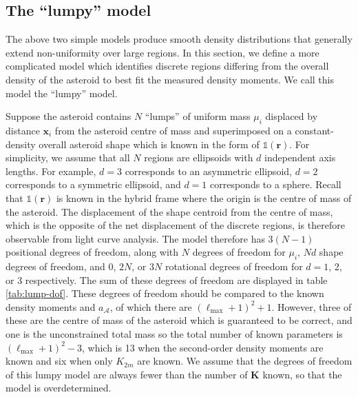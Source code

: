 \documentclass[fleqn,usenatbib]{mnras}
\begin{document}
\subsection{The ``lumpy'' model}
\label{sec:lumpy}

The above two simple models produce smooth density distributions that generally extend non-uniformity over large regions. In this section, we define a more complicated model which identifies discrete regions differing from the overall density of the asteroid to best fit the measured density moments. We call this model the ``lumpy'' model.

Suppose the asteroid contains $N$ ``lumps'' of uniform mass $\mu_i$ displaced by distance $\bm x_i$ from the asteroid centre of mass and superimposed on a constant-density overall asteroid shape which is known in the form of $\mathds{1}(\bm r)$. For simplicity, we assume that all $N$ regions are ellipsoids with $d$ independent axis lengths. For example, $d=3$ corresponds to an asymmetric ellipsoid, $d=2$ corresponds to a symmetric ellipsoid, and $d=1$ corresponds to a sphere. Recall that $\mathds{1}(\bm r)$ is known in the hybrid frame where the origin is the centre of mass of the asteroid. The displacement of the shape centroid from the centre of mass, which is the opposite of the net displacement of the discrete regions, is therefore observable from light curve analysis. The model therefore has $3(N-1)$ positional degrees of freedom, along with $N$ degrees of freedom for $\mu_i$, $Nd$ shape degrees of freedom, and 0, $2N$, or $3N$ rotational degrees of freedom for $d=1$, 2, or 3 respectively. The sum of these degrees of freedom are displayed in table \ref{tab:lump-dof}. These degrees of freedom should be compared to the known density moments and $a_\mathcal{A}$, of which there are $(\ell_\text{max}+1)^2+1$. However, three of these are the centre of mass of the asteroid which is guaranteed to be correct, and one is the unconstrained total mass so the total number of known parameters is $(\ell_\text{max}+1)^2 - 3$, which is 13 when the second-order density moments are known and six when only $K_{2m}$ are known. We assume that the degrees of freedom of this lumpy model are always fewer than the number of $\bm K$ known, so that the model is overdetermined.
\end{document}
